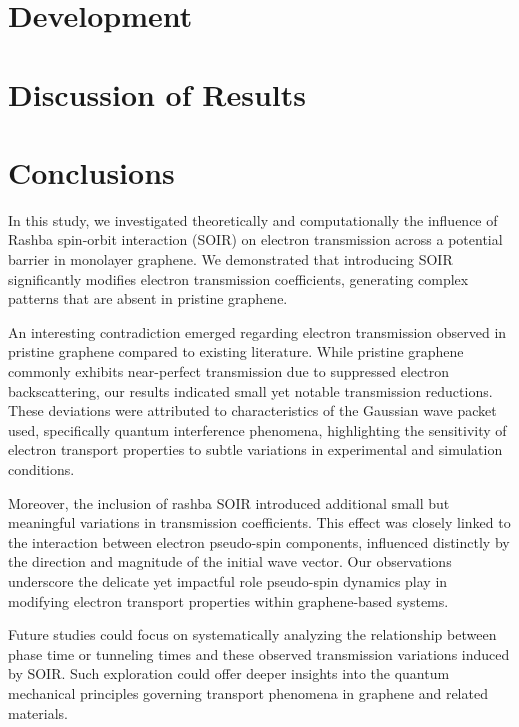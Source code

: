 \documentclass[twocolumn, aps, prb, 10pt]{revtex4-2}
\begin{document}
    \section{Development}\label{sec:development}
    

    \section{Discussion of Results}\label{sec:discussion-of-results}
    

    \section{Conclusions}\label{sec:conclusions}

    In this study, we investigated theoretically and computationally the influence of Rashba spin-orbit interaction (SOIR) on electron transmission across a potential barrier in monolayer graphene.
    We demonstrated that introducing SOIR significantly modifies electron transmission coefficients, generating complex patterns that are absent in pristine graphene.

    An interesting contradiction emerged regarding electron transmission observed in pristine graphene compared to existing literature.
    While pristine graphene commonly exhibits near-perfect transmission due to suppressed electron backscattering, our results indicated small yet notable transmission reductions.
    These deviations were attributed to characteristics of the Gaussian wave packet used, specifically quantum interference phenomena, highlighting the sensitivity of electron transport properties to subtle variations in experimental and simulation conditions.

    Moreover, the inclusion of rashba SOIR introduced additional small but meaningful variations in transmission coefficients.
    This effect was closely linked to the interaction between electron pseudo-spin components, influenced distinctly by the direction and magnitude of the initial wave vector.
    Our observations underscore the delicate yet impactful role pseudo-spin dynamics play in modifying electron transport properties within graphene-based systems.

    Future studies could focus on systematically analyzing the relationship between phase time or tunneling times and these observed transmission variations induced by SOIR. Such exploration could offer deeper insights into the quantum mechanical principles governing transport phenomena in graphene and related materials.
\end{document}
